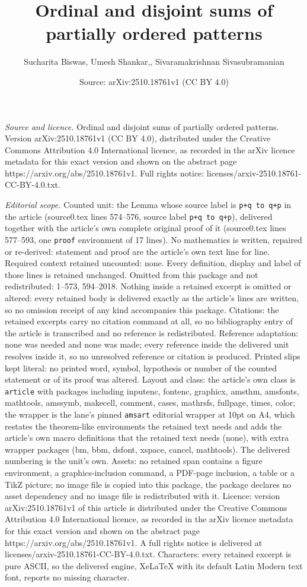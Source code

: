 \documentclass[10pt,a4paper]{amsart}
\title[Ordinal and disjoint sums of partially ordered patterns]{Ordinal and disjoint sums of partially ordered patterns}
\author{Sucharita Biswas, Umesh Shankar,, Sivaramakrishnan Sivasubramanian}
\date{Source: arXiv:2510.18761v1 (CC BY 4.0)}
\begin{document}
\maketitle

\noindent\emph{Source and licence.} Ordinal and disjoint sums of partially ordered patterns. Version arXiv:2510.18761v1 (CC BY 4.0), distributed under the Creative Commons Attribution 4.0 International licence, as recorded in the arXiv licence metadata for this exact version and shown on the abstract page https://arxiv.org/abs/2510.18761v1. Full rights notice: licenses/arxiv-2510.18761-CC-BY-4.0.txt.\par\smallskip

\noindent\textit{Editorial scope.} Counted unit: the Lemma whose source label is \texttt{p+q to q+p} in the article (source0.tex lines 574--576, source label \texttt{p+q to q+p}), delivered together with the article's own complete original proof of it (source0.tex lines 577--593, one \texttt{proof} environment of 17 lines). No mathematics is written, repaired or re-derived: statement and proof are the article's own text line for line. Required context retained uncounted: none. Every definition, display and label of those lines is retained unchanged. Omitted from this package and not redistributed: 1--573, 594--2018. Nothing inside a retained excerpt is omitted or altered: every retained body is delivered exactly as the article's lines are written, so no omission receipt of any kind accompanies this package. Citations: the retained excerpts carry no citation command at all, so no bibliography entry of the article is transcribed and no reference is redistributed. Reference adaptation: none was needed and none was made; every reference inside the delivered unit resolves inside it, so no unresolved reference or citation is produced. Printed slips kept literal: no printed word, symbol, hypothesis or number of the counted statement or of its proof was altered. Layout and class: the article's own class is \texttt{article} with packages including inputenc, fontenc, graphicx, amsthm, amsfonts, mathtools, amssymb, makecell, comment, cases, mathrsfs, fullpage, times, color; the wrapper is the lane's pinned \texttt{amsart} editorial wrapper at 10pt on A4, which restates the theorem-like environments the retained text needs and adds the article's own macro definitions that the retained text needs (none), with extra wrapper packages (bm, bbm, dsfont, xspace, cancel, mathtools). The delivered numbering is the unit's own. Assets: no retained span contains a figure environment, a graphics-inclusion command, a PDF-page inclusion, a table or a TikZ picture; no image file is copied into this package, the package declares no asset dependency and no image file is redistributed with it. Licence: version arXiv:2510.18761v1 of this article is distributed under the Creative Commons Attribution 4.0 International licence, as recorded in the arXiv licence metadata for this exact version and shown on the abstract page https://arxiv.org/abs/2510.18761v1. A full rights notice is delivered at licenses/arxiv-2510.18761-CC-BY-4.0.txt. Characters: every retained excerpt is pure ASCII, so the delivered engine, XeLaTeX with its default Latin Modern text font, reports no missing character.
\end{document}
